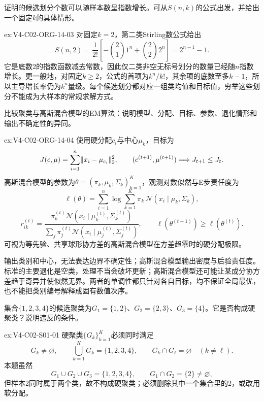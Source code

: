 \begin{SLChapterExercisePairSection}
\begin{exercise}\label{ex:V4-C02-ORG-14-03}
证明\kMeans{}的候选划分个数可以随样本数呈指数增长。可从$S(n,k)$的公式出发，并给出一个固定$k$的具体情形。
\end{exercise}
\ifSLFullEdition
{}\label{sol:V4-C02-ORG-14-03}
\begin{chapterexercisesolution}{ex:V4-C02-ORG-14-03}
对固定$k=2$，第二类Stirling数公式给出
\[
S(n,2)=\frac1{2!}\left[-\binom21 1^n+\binom22 2^n\right]
=2^{n-1}-1.
\]
它是底数2的指数函数减去常数，因此仅二类非空无标号划分的数量已经随$n$指数增长。更一般地，对固定$k\geq2$，公式的首项为$k^n/k!$，其余项的底数至多$k-1$，所以主导增长率仍为$k^n$量级。每个候选划分都对应一组类均值和目标值，穷举这些划分不能成为大样本\kMeans{}的常规求解方式。
\end{chapterexercisesolution}
\fi

\begin{exercise}\label{ex:V4-C02-ORG-14-04}
比较\kMeans{}聚类与高斯混合模型的EM算法：说明模型、分配、目标、参数、退化情形和输出不确定性的异同。
\end{exercise}
\ifSLFullEdition
{}\label{sol:V4-C02-ORG-14-04}
\begin{chapterexercisesolution}{ex:V4-C02-ORG-14-04}
\kMeans{}使用硬分配$c_i$与中心$\mu_k$，目标为
\[
J(c,\mu)=\sum_{i=1}^{n}\lVert x_i-\mu_{c_i}\rVert_2^2,
\qquad
(c^{(t+1)},\mu^{(t+1)})\Longrightarrow J_{t+1}\le J_t.
\]
高斯混合模型的参数为$\theta=(\pi_k,\mu_k,\Sigma_k)_{k=1}^{K}$，观测对数似然与E步责任度为
\[
\ell(\theta)=\sum_{i=1}^{n}\log\sum_{k=1}^{K}
\pi_k\,\mathcal N(x_i\mid\mu_k,\Sigma_k),
\]
\[
r_{ik}^{(t)}
=\frac{\pi_k^{(t)}\mathcal N(x_i\mid\mu_k^{(t)},\Sigma_k^{(t)})}
{\sum_j\pi_j^{(t)}\mathcal N(x_i\mid\mu_j^{(t)},\Sigma_j^{(t)})},
\qquad
\ell(\theta^{(t+1)})\ge\ell(\theta^{(t)}).
\]
\kMeans{}可视为等先验、共享球形协方差的高斯混合模型在方差趋零时的硬分配极限。

\kMeans{}输出类别和中心，无法表达边界不确定性；高斯混合模型输出密度与后验责任度。标准\kMeans{}的主要退化是空类，处理不当会破坏更新；高斯混合模型还可能让某成分协方差趋于奇异并使似然无界。两者的单调性都只针对各自目标，均不保证全局最优，也不能把类别编号解释成固有数值次序。
\end{chapterexercisesolution}
\fi

\begin{exercise}\label{ex:V4-C02-S01-01}
集合$\{1,2,3,4\}$的候选聚类为$G_1=\{1,2\}$、$G_2=\{2,3\}$、$G_3=\{4\}$。它是否构成硬聚类？说明违反的条件。
\end{exercise}
\ifSLFullEdition
{}\label{sol:V4-C02-S01-01}
\begin{chapterexercisesolution}{ex:V4-C02-S01-01}
硬聚类$\{G_k\}_{k=1}^{K}$必须同时满足
\[
G_k\ne\varnothing,
\qquad
\bigcup_{k=1}^{K}G_k=\{1,2,3,4\},
\qquad
G_k\cap G_\ell=\varnothing\quad(k\ne\ell).
\]
本题虽然
\[
G_1\cup G_2\cup G_3=\{1,2,3,4\},
\qquad
G_1\cap G_2=\{2\}\ne\varnothing,
\]
但样本2同时属于两个类，故不构成硬聚类；必须删除其中一个集合里的2，或改用软分配。
\end{chapterexercisesolution}
\fi


\end{SLChapterExercisePairSection}
